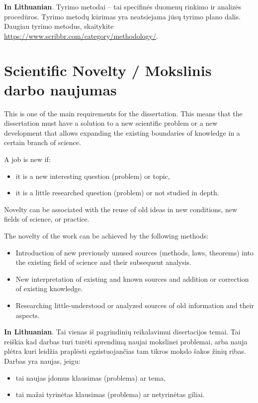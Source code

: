 \textbf{In Lithuanian}. 
Tyrimo metodai – tai specifinės duomenų rinkimo ir analizės procedūros. Tyrimo metodų kūrimas yra neatsiejama jūsų tyrimo plano dalis. Daugiau tyrimo metodus, skaitykite \url{https://www.scribbr.com/category/methodology/}.


\section*{Scientific Novelty / Mokslinis darbo naujumas} %

This is one of the main requirements for the dissertation. This means that the dissertation must have a solution to a new scientific problem or a new development that allows expanding the existing boundaries of knowledge in a certain branch of science.

A job is new if:
\begin{itemize}
 \item it is a new interesting question (problem) or topic,
 \item it is a little researched question (problem) or not studied in depth.
\end{itemize}

Novelty can be associated with the reuse of old ideas in new conditions, new fields of science, or practice.

The novelty of the work can be achieved by the following methods:
\begin{itemize}
 \item Introduction of new previously unused sources (methods, laws, theorems) into the existing field of science and their subsequent analysis.
 \item New interpretation of existing and known sources and addition or correction of existing knowledge.
 \item Researching little-understood or analyzed sources of old information and their aspects.
\end{itemize}


\textbf{In Lithuanian}. Tai vienas iš pagrindinių reikalavimui disertacijos temai. Tai reiškia kad darbas turi turėti sprendimą naujai mokslinei problemai, arba nauja plėtra kuri leidžia praplėsti egzistuojančias tam tikros mokslo šakos žinių ribas.
Darbas yra naujas, jeigu:
\begin{itemize}
    \item tai naujas įdomus klausimas (problema) ar tema,
    \item tai mažai tyrinėtas klausimas (problema) ar netyrinėtas giliai.
\end{itemize}

